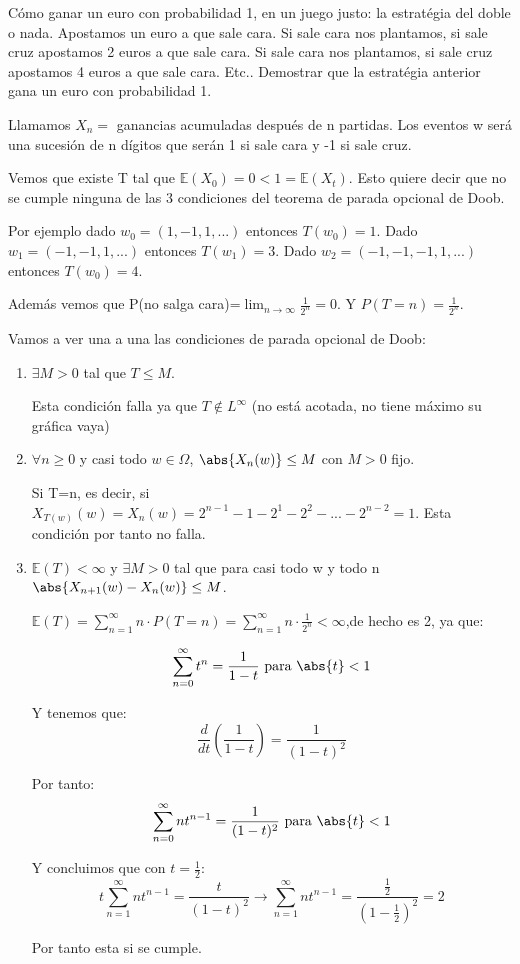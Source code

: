 \begin{problem}[6] C\'omo ganar un euro con probabilidad 1, en un juego justo: la estrat\'egia del doble o nada.
Apostamos un euro a que sale cara. Si sale cara nos plantamos, si sale cruz apostamos
2 euros a que sale cara. Si sale cara nos plantamos, si sale cruz apostamos
4 euros a que sale cara. Etc.. Demostrar que la  estrat\'egia anterior gana un euro
 con probabilidad 1.
\solution

\begin{expla}

\end{expla}
Llamamos $X_n=$ ganancias acumuladas después de n partidas. Los eventos w será una sucesión de n dígitos que serán 1 si sale cara y -1 si sale cruz.

Vemos que existe T tal que $\mathbb{E}(X_0) = 0 < 1 = \mathbb{E}(X_t)$. Esto quiere decir que no se cumple ninguna de las 3 condiciones del teorema de parada opcional de Doob.

Por ejemplo dado $w_0=(1,-1,1,...)$ entonces $T(w_0)=1$. Dado $w_1=(-1,-1,1,...)$ entonces $T(w_1)=3$. Dado $w_2=(-1,-1,-1,1,...)$ entonces $T(w_0)=4$. 

Además vemos que P(no salga cara)=$\lim_{n \rightarrow \infty} \frac{1}{2^n} = 0$. Y $P(T=n)=\frac{1}{2^n}$.

Vamos a ver una a una las condiciones de parada opcional de Doob:
\begin{enumerate}
\item $\exists M >0$ tal que $T \leq M$. 

Esta condición falla ya que $T \notin L^{\infty}$ (no está acotada, no tiene máximo su gráfica vaya)
\item $\forall n \geq 0$ y casi todo $w \in \Omega$, $\abs{X_n(w)} \leq M$ con $M >0$ fijo.

Si T=n, es decir, si $X_{T(w)}(w)=X_n(w)=2^{n-1}-1-2^1-2^2-...-2^{n-2} = 1$. Esta condición por tanto no falla.

\item $\mathbb{E}(T)<\infty$ y $\exists M > 0$ tal que para casi todo w y todo n $\abs{X_{n+1}(w) - X_n(w)} \leq M$.

$\mathbb{E}(T)=\sum_{n=1}^{\infty} n \cdot P(T=n) = \sum_{n=1}^{\infty} n \cdot \frac{1}{2^n} < \infty$,de hecho es 2, ya que:

\[
\sum_{n=0}^{\infty} t^n = \frac{1}{1-t} \text{ para } \abs{t}<1
\]

Y tenemos que:
\[
\frac{d}{dt}(\frac{1}{1-t})=\frac{1}{(1-t)^2}
\]

Por tanto:
\[
\sum_{n=0}^{\infty} nt^{n-1} = \frac{1}{(1-t)^2} \text{ para } \abs{t}<1
\]

Y concluimos que con $t=\frac{1}{2}$:
\[
t \sum_{n=1}^{\infty}nt^{n-1}=\frac{t}{(1-t)^2} \rightarrow \sum_{n=1}^{\infty}nt^{n-1} = \frac{\frac{1}{2}}{(1-\frac{1}{2})^2}=2
\]

Por tanto esta si se cumple.
\end{enumerate}

\end{problem}

